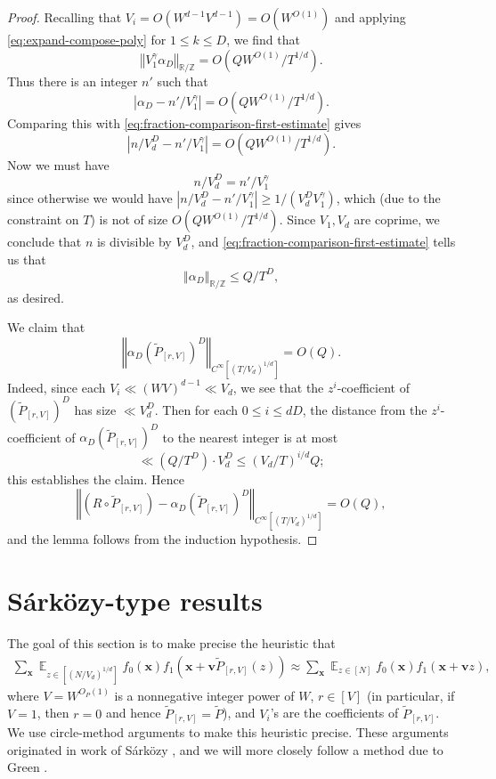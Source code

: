 \documentclass[11pt]{amsart}
\theoremstyle{definition}
\DeclareMathOperator*{\E}{\mathbb{E}}
\newcommand{\bv}{{\textbf{v}}}
\newcommand{\bx}{{\textbf{x}}}
\newcommand{\norm}[1]{\left\Vert #1\right\Vert}
\newcommand{\abs}[1]{\mathopen{}\left| #1\mathclose{}\right|}
\begin{document}
\begin{proof}
Recalling that $V_i=O(W^{d-1}V^{d-1})=O(W^{O(1)})$ 
and applying \eqref{eq:expand-compose-poly} for $1 \leq k \leq D$, we find that
$$\norm{V_1^{\gamma}\alpha_D}_{\mathbb{R}/\mathbb{Z}}=O(QW^{O(1)}/T^{1/d}).$$ %
Thus there is an integer $n'$ such that
$$\abs{\alpha_D-n'/V_1^\gamma}=O(QW^{O(1)}/T^{1/d}).$$
Comparing this with \eqref{eq:fraction-comparison-first-estimate} gives
$$\abs{n/V_d^D-n'/V_1^\gamma}=O(QW^{O(1)}/T^{1/d}).$$
Now we must have
$$n/V_d^D=n'/V_1^\gamma$$
since otherwise we would have $\abs{n/V_d^D-n'/V_1^\gamma} \geq 1/(V_d^D V_1^\gamma)$, which (due to the constraint on $T$) is not of size $O(QW^{O(1)}/T^{1/d})$.  Since $V_1,V_d$ are coprime, we conclude that $n$ is divisible by $V_d^D$, and \eqref{eq:fraction-comparison-first-estimate} tells us that
$$\norm{\alpha_D}_{\mathbb{R}/\mathbb{Z}} \leq Q/T^D,$$
as desired.

We claim that
$$\norm{\alpha_D (\widetilde P_{[r, V]})^D}_{C^\infty [(T/V_d)^{1/d}]}=O(Q).$$
Indeed, since each $V_i \ll (WV)^{d-1} \ll V_d$, we see that the $z^i$-coefficient of $(\widetilde P_{[r, V]})^D$ has size $\ll V_d^{D}$.  Then for each $0 \leq i \leq dD$,
the distance from the $z^i$-coefficient of $\alpha_D (\widetilde P_{[r, V]})^D$ to the nearest integer is at most
$$\ll (Q/T^D)\cdot V_d^{D} \leq (V_d/T)^{i/d}Q;$$
this establishes the claim.   Hence
$$\norm{(R\circ \widetilde P_{[r, V]})-\alpha_D (\widetilde P_{[r, V]})^D}_{C^\infty [(T/V_d)^{1/d}]}=O(Q),$$
and the lemma follows from the induction hypothesis.
\end{proof}


\section{S\'ark\"ozy-type results}\label{A: Sarkozy}
The goal of this section is to make precise the heuristic that
\begin{align}\label{E: Sarkozy heuristic}
    \sum_\bx \E_{z\in[(N/V_d)^{1/d}]}f_0(\bx) f_1(\bx + \bv \widetilde{P}_{[r, V]}(z)) \approx \sum_{\bx}\E_{z\in[N]}f_0(\bx)f_1(\bx + \bv z),
\end{align}
where $V=W^{O_P(1)}$ is a nonnegative integer power of $W$, $r\in[V]$ (in particular, if $V = 1$, then $r=0$ and hence $\widetilde{P}_{[r, V]} = \widetilde{P}$), and $V_i$'s are the coefficients of $\widetilde{P}_{[r, V]}$.
We use circle-method arguments to make this heuristic precise.  These arguments originated in work of S\'ark\"ozy \cite{Sa78a, Sa78b}, and we will more closely follow a method due to Green \cite{Gr02}.
\end{document}
